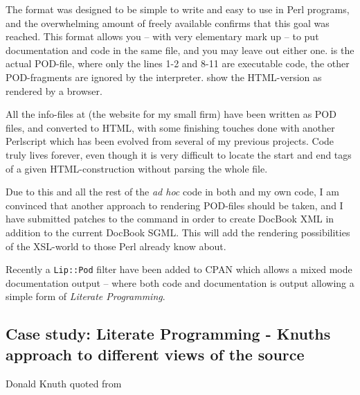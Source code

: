 
The
format was designed to be simple to write and easy to use in
Perl programs, and the overwhelming amount of freely
available  confirms that this goal was reached.  This format
allows you -- with very elementary mark up -- to put
documentation and code in the same file, and you may leave
out either one.   is the
actual POD-file, where only the lines 1-2 and 8-11 are executable
code, the other POD-fragments are ignored by the interpreter.
 show the HTML-version as
rendered by a browser.



All the info-files at
 (the
website for my small firm) have been written as POD files,
and converted to HTML, with some finishing touches done with
another Perlscript which has been evolved from
%
several of my previous projects.  Code truly lives forever, even
though it is very difficult to locate the start and end tags of a
given HTML-construction without parsing the whole file.

Due to this and all the rest of the \textit{ad hoc} code in both
 and my own code, I am convinced that another
approach to rendering POD-files should be taken, and I have submitted
patches to the  command in order to create
DocBook XML in addition to the current DocBook SGML.  This will
add the rendering possibilities of the XSL-world to those Perl already
know about.

Recently a \texttt{Lip::Pod} filter have been added to CPAN which
allows a mixed mode documentation output -- where both code
and documentation is output allowing a simple form of \textit{Literate
Programming}.




\subsection{Case study: Literate Programming - Knuths approach to different views
  of the source}
\label{sec:literate-programming}

%
{Donald Knuth}%
{\cite{knuthliterateprogramming} quoted from
  }


